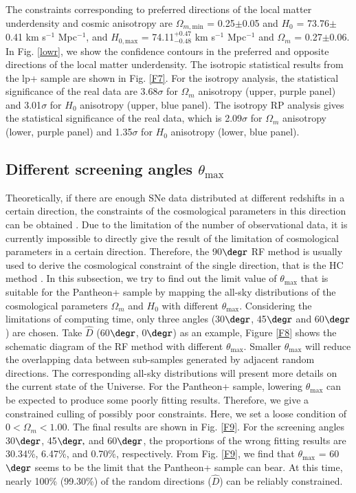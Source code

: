 \documentclass{aa}
\def\tm{$\theta_\mathrm{max}$ }
\begin{document}
The constraints corresponding to preferred directions of the local matter underdensity and cosmic anisotropy are $\Omega_{m, \mathrm{min}}$ = 0.25$\pm$0.05 and $H_{0}$ = 73.76$\pm$0.41 km s$^{-1}$ Mpc$^{-1}$, and $H_{0, \mathrm{max}}$ = 74.11$^{+0.47}_{-0.48}$ km s$^{-1}$ Mpc$^{-1}$ and $\Omega_{m}$ = 0.27$\pm$0.06. In Fig. \ref{lowr}, we show the confidence contours in the preferred and opposite directions of the local matter underdensity. The isotropic statistical results from the lp+ sample are shown in Fig. \ref{F7}. For the isotropy analysis, the statistical significance of the real data are 3.68$\sigma$ for $\Omega_{m}$ anisotropy (upper, purple panel) and 3.01$\sigma$ for $H_{0}$ anisotropy (upper, blue panel). The isotropy RP analysis gives the statistical significance of the real data, which is 2.09$\sigma$ for $\Omega_{m}$ anisotropy (lower, purple panel) and 1.35$\sigma$ for $H_{0}$ anisotropy (lower, blue panel). 


\subsection{Different screening angles \tm }\label{theta}
Theoretically, if there are enough SNe data distributed at different redshifts in a certain direction, the constraints of the cosmological parameters in this direction can be obtained \citep{2016MNRAS.460..617L,2018PhRvD..97l3515D,2023CQGra..40i4001K}. Due to the limitation of the number of observational data, it is currently impossible to directly give the result of the limitation of cosmological parameters in a certain direction. Therefore, the 90$\degr$ RF method is usually used to derive the cosmological constraint of the single direction, that is the HC method \citep{2007AA...474..717S}. In this subsection, we try to find out the limit value of $\theta_\mathrm{max}$ that is suitable for the Pantheon+ sample by mapping the all-sky distributions of the cosmological parameters $\Omega_{m}$ and $H_{0}$ with different $\theta_\mathrm{max}$. Considering the limitations of computing time, only three angles (30$\degr$, 45$\degr$ and 60$\degr$) are chosen. Take $\hat{D}$ (60$\degr$, 0$\degr$) as an example, Figure \ref{F8} shows the schematic diagram of the RF method with different $\theta_\mathrm{max}$. Smaller $\theta_\mathrm{max}$ will reduce the overlapping data between sub-samples generated by adjacent random directions. The corresponding all-sky distributions will present more details on the current state of the Universe. For the Pantheon+ sample, lowering $\theta_\mathrm{max}$ can be expected to produce some poorly fitting results. Therefore, we give a constrained culling of possibly poor constraints. Here, we set a loose condition of $0 < \Omega_{m} < 1.00$. The final results are shown in Fig. \ref{F9}. For the screening angles 30$\degr$, 45$\degr,$ and 60$\degr$, the proportions of the wrong fitting results are 30.34\%, 6.47\%, and 0.70\%, respectively. From Fig. \ref{F9}, we find that \tm = 60$\degr$ seems to be the limit that the Pantheon+ sample can bear. At this time, nearly 100\% (99.30\%) of the random directions ($\hat{D}$) can be reliably constrained.
\end{document}
